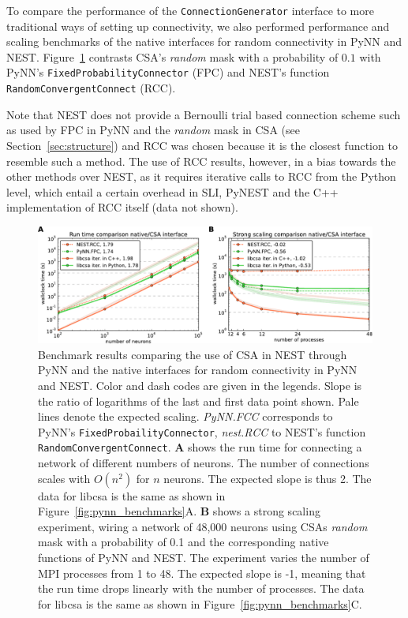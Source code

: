 \documentclass{frontiersSCNS} %
\newcommand{\INLINEFIGS}{} %
\newcommand{\Figure}[2]{Figure~\ref{#2}}
\newcommand{\Figure}[2]{Figure~#1}
\begin{document}
To compare the performance of the \verb|ConnectionGenerator| interface
to more traditional ways of setting up connectivity, we also performed
performance and scaling benchmarks of the native interfaces for random
connectivity in PyNN and NEST. \Figure{5}{fig:native_benchmarks}
contrasts CSA's \emph{random} mask with a probability of $0.1$ with
PyNN's \verb|FixedProbabilityConnector| (FPC) and NEST's function
\verb|RandomConvergentConnect| (RCC).

Note that NEST does not provide a Bernoulli trial based connection
scheme such as used by FPC in PyNN and the \emph{random} mask in CSA
(see Section~\ref{sec:structure}) and RCC was chosen because it is the
closest function to resemble such a method. The use of RCC results,
however, in a bias towards the other methods over NEST, as it requires
iterative calls to RCC from the Python level, which entail a certain
overhead in SLI, PyNEST and the C++ implementation of RCC itself (data
not shown).

\ifdefined\INLINEFIGS
\begin{figure}[ht]
\centering
\includegraphics[scale=.7]{benchmarks/native_routines.pdf}
\caption{Benchmark results comparing the use of CSA in NEST through
  PyNN and the native interfaces for random connectivity in PyNN and
  NEST. Color and dash codes are given in the legends. Slope is the
  ratio of logarithms of the last and first data point shown. Pale
  lines denote the expected scaling. \emph{PyNN.FCC} corresponds to
  PyNN's \texttt{FixedProbailityConnector}, \emph{nest.RCC} to NEST's
  function \texttt{RandomConvergentConnect}. \textbf{A} shows the run
  time for connecting a network of different numbers of neurons. The
  number of connections scales with $O(n^2)$ for $n$ neurons. The
  expected slope is thus 2. The data for libcsa is the same as shown
  in \Figure{4}{fig:pynn_benchmarks}A. \textbf{B} shows a strong
  scaling experiment, wiring a network of 48,000 neurons using CSAs
  \emph{random} mask with a probability of 0.1 and the corresponding
  native functions of PyNN and NEST. The experiment varies the number
  of MPI processes from 1 to 48. The expected slope is -1, meaning
  that the run time drops linearly with the number of processes. The
  data for libcsa is the same as shown in
  \Figure{4}{fig:pynn_benchmarks}C.}\label{fig:native_benchmarks}
\end{figure}
\fi
\end{document}

